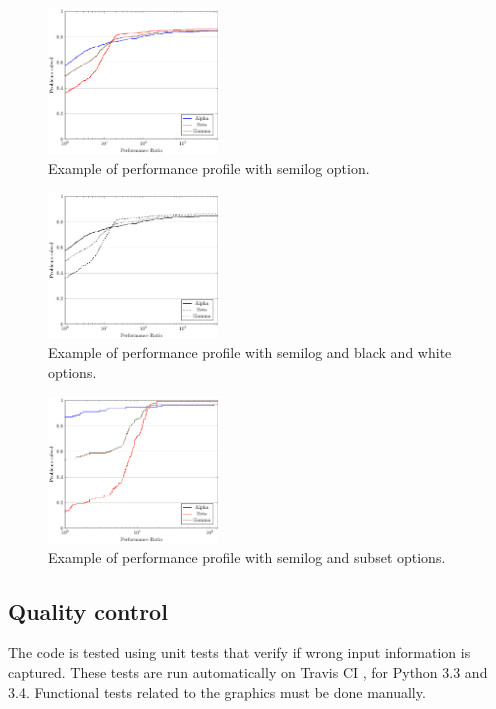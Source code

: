     \begin{figure}[!ht]
      \centering
      \includegraphics[width=0.4\textwidth]{plots/abc-semilog.pdf}
      \caption{Example of performance profile with semilog option.}
      \label{fig:example2}
    \end{figure}
    \begin{figure}[!ht]
      \centering
      \includegraphics[width=0.4\textwidth]{plots/abc-semilog-bw.pdf}
      \caption{Example of performance profile with semilog and black and white
        options.}
      \label{fig:example3}
    \end{figure}
    \begin{figure}[!ht]
      \centering
      \includegraphics[width=0.4\textwidth]{plots/abc-semilog-hs.pdf}
      \caption{Example of performance profile with semilog and subset options.}
      \label{fig:example4}
    \end{figure}

\subsection*{Quality control}

    The code is tested using unit tests that verify if wrong input information
    is captured. These tests are run automatically on Travis CI
    \cite{url:travis}, for Python 3.3 and 3.4.
    Functional tests related to the graphics must be done manually.
